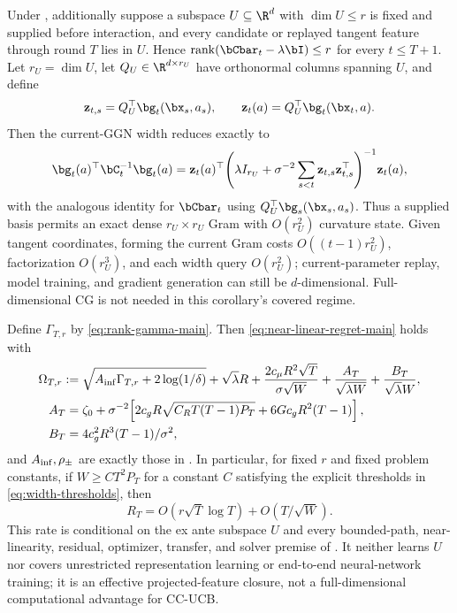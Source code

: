 \begin{corollary}\label{cor:rank-near-linear}
Under , additionally suppose a subspace
$U\subseteq\R^d$ with $\dim U\le r$ is fixed and supplied before interaction,
and every candidate or replayed tangent feature through round $T$ lies in $U$.
Hence $\operatorname{rank}(\bCbar_t-\lambda\bI)\le r$ for every
$t\le T+1$.  Let $r_U=\dim U$, let $Q_U\in\R^{d\times r_U}$ have
orthonormal columns spanning $U$, and define
\[
 \mathbf z_{t,s}=Q_U^\top\bg_t(\bx_s,a_s),\qquad
 \mathbf z_t(a)=Q_U^\top\bg_t(\bx_t,a).
\]
Then the current-GGN width reduces exactly to
\begin{equation}\label{eq:projected-width}
 \bg_t(a)^\top\bC_t^{-1}\bg_t(a)
 =\mathbf z_t(a)^\top\!\left(\lambda I_{r_U}
 +\sigma^{-2}\sum_{s<t}\mathbf z_{t,s}\mathbf z_{t,s}^\top
 \right)^{-1}\!\mathbf z_t(a),
\end{equation}
with the analogous identity for $\bCbar_t$ using
$Q_U^\top\bg_s(\bx_s,a_s)$.  Thus a supplied basis permits an exact dense
$r_U\times r_U$ Gram with $O(r_U^2)$ curvature state.  Given tangent
coordinates, forming the current Gram costs $O((t-1)r_U^2)$, factorization
$O(r_U^3)$, and each width query $O(r_U^2)$; current-parameter replay, model
training, and gradient generation can still be $d$-dimensional.
Full-dimensional CG is not needed in this corollary's covered regime.

Define $\Gamma_{T,r}$ by \eqref{eq:rank-gamma-main}.  Then
\eqref{eq:near-linear-regret-main} holds with
\begin{align*}
\Omega_{T,r}:={}&
 \sqrt{A_{\rm inf}\Gamma_{T,r}+2\log(1/\delta)}+\sqrt\lambda R
 +\frac{2c_\mu R^2\sqrt T}{\sigma\sqrt W}
 +\frac{A_T}{\sqrt{\lambda W}}+\frac{B_T}{\sqrt\lambda W},\\
A_T={}&\zeta_0+\sigma^{-2}\!\left[
 2c_gR\sqrt{C_RT(T-1)P_T}+6Gc_gR^2(T-1)\right],\\
B_T={}&4c_g^2R^3(T-1)/\sigma^2,
\end{align*}
and $A_{\rm inf},\rho_\pm$ are exactly those in .
In particular, for fixed $r$ and fixed problem constants, if
$W\ge C T^2P_T$ for a constant $C$ satisfying the explicit thresholds in
\eqref{eq:width-thresholds}, then
\[
 R_T=O(r\sqrt T\log T)+O(T/\sqrt W).
\]
This rate is conditional on the ex ante subspace $U$ and every bounded-path,
near-linearity, residual, optimizer, transfer, and solver premise of
.  It neither learns $U$ nor covers unrestricted
representation learning or end-to-end neural-network training; it is an
effective projected-feature closure, not a full-dimensional computational
advantage for CC-UCB.
\end{corollary}
